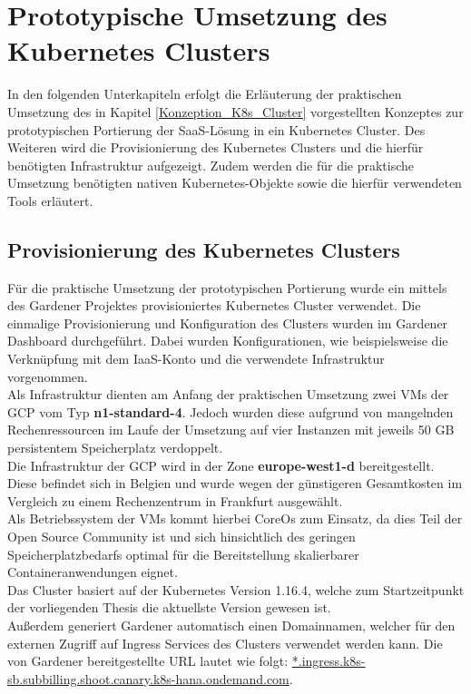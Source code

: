 \chapter{Prototypische Umsetzung des Kubernetes Clusters}
\label{Umsetzung_K8s_Cluster}
In den folgenden Unterkapiteln erfolgt die Erläuterung der praktischen Umsetzung des in Kapitel \ref{Konzeption_K8s_Cluster} vorgestellten Konzeptes zur prototypischen Portierung der \ac{SaaS}-Lösung in ein Kubernetes Cluster. Des Weiteren wird die Provisionierung des Kubernetes Clusters und die hierfür benötigten Infrastruktur aufgezeigt. Zudem werden die für die praktische Umsetzung benötigten nativen Kubernetes-Objekte sowie die hierfür verwendeten Tools erläutert.
\section{Provisionierung des Kubernetes Clusters}
\label{Umsetzung_Provisionierung_Cluster}
Für die praktische Umsetzung der prototypischen Portierung wurde ein mittels des Gardener Projektes provisioniertes Kubernetes Cluster verwendet. Die einmalige Provisionierung und Konfiguration des Clusters wurden im Gardener Dashboard durchgeführt. Dabei wurden Konfigurationen, wie beispielsweise die Verknüpfung mit dem \ac{IaaS}-Konto und die verwendete Infrastruktur vorgenommen.\\
Als Infrastruktur dienten am Anfang der praktischen Umsetzung zwei \acsp{VM} der \ac{GCP} vom Typ \textbf{n1-standard-4}. Jedoch wurden diese aufgrund von mangelnden Rechenressourcen im Laufe der Umsetzung auf vier Instanzen mit jeweils 50 \ac{GB} persistentem Speicherplatz verdoppelt. \\
Die Infrastruktur der \ac{GCP} wird in der Zone \textbf{europe-west1-d} bereitgestellt. Diese befindet sich in Belgien und wurde wegen der günstigeren Gesamtkosten im Vergleich zu einem Rechenzentrum in Frankfurt ausgewählt.
\\
Als Betriebssystem der \acsp{VM} kommt hierbei CoreOs zum Einsatz, da dies Teil der Open Source Community ist und sich hinsichtlich des geringen Speicherplatzbedarfs optimal für die Bereitstellung skalierbarer Containeranwendungen eignet. \\ 
Das Cluster basiert auf der Kubernetes Version 1.16.4, welche zum Startzeitpunkt der vorliegenden Thesis die aktuellste Version gewesen ist.\\
Außerdem generiert Gardener automatisch einen Domainnamen, welcher für den externen Zugriff auf Ingress Services des Clusters verwendet werden kann. Die von Gardener bereitgestellte \ac{URL} lautet wie folgt: \url{*.ingress.k8s-sb.subbilling.shoot.canary.k8s-hana.ondemand.com}.\\
